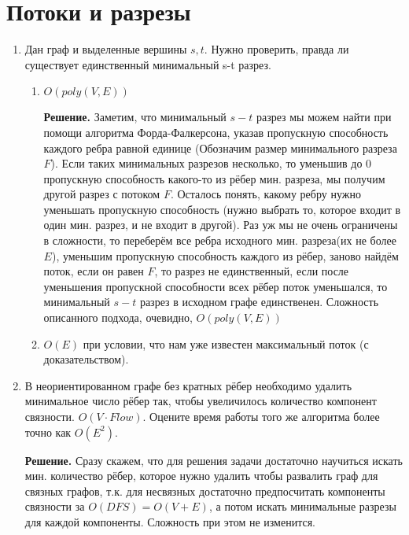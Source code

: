 \section*{Потоки и разрезы}
\begin{enumerate}
	\item Дан граф и выделенные вершины $s, t$. Нужно проверить, правда ли существует единственный минимальный s-t разрез.
	\begin{enumerate}
		\item $O(poly(V, E))$
		
		\textbf{Решение.} Заметим, что минимальный $s-t$ разрез мы можем найти при помощи алгоритма 
		Форда-Фалкерсона, указав пропускную способность каждого ребра равной единице (Обозначим размер минимального 
		разреза $F$). Если таких минимальных разрезов несколько, то уменьшив до 0 пропускную способность какого-то 
		из рёбер мин. разреза, мы получим другой разрез с потоком $F$. Осталось понять, какому ребру нужно 
		уменьшать пропускную способность (нужно выбрать то, которое входит в один мин. разрез, и не входит в 
		другой). Раз уж мы не очень ограничены в сложности, то переберём все ребра исходного мин. разреза(их не 
		более $E$), уменьшим пропускную способность каждого из рёбер, заново найдём поток, если он равен $F$, то 
		разрез не единственный, если после уменьшения пропускной способности всех рёбер поток уменьшался, то 
		минимальный $s-t$ разрез в исходном графе единственен. Сложность описанного подхода, очевидно, $O(poly(V, 
		E))$
		\item $O(E)$ при условии, что нам уже известен максимальный поток (с доказательством).
	\end{enumerate}
	
	\item В неориентированном графе без кратных рёбер необходимо удалить минимальное число рёбер так, чтобы 
	увеличилось количество компонент связности. $O(V \cdot Flow)$. Оцените время работы	того же алгоритма более 
	точно как $O(E^2)$.
	
	
	\textbf{Решение.} Сразу скажем, что для решения задачи достаточно научиться искать мин. количество рёбер, 
	которое нужно удалить чтобы развалить граф для связных графов, т.к. для несвязных достаточно предпосчитать 
	компоненты связности за $O(DFS) = O(V + E)$, а потом искать минимальные разрезы для каждой компоненты. 
	Сложность при этом не изменится.
	

\end{enumerate}
